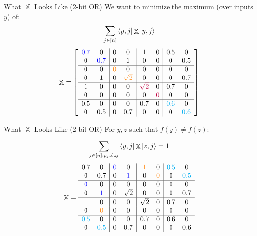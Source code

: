 \documentclass[12pt]{beamer}
\DeclareMathOperator{\X}{\mathbb{X}}		     %
\begin{document}
\begin{frame}{What $\X$ Looks Like (2-bit OR)}
    We want to minimize the maximum (over inputs $y$) of:
    \begin{align}
         \sum_{j \in [n]}
    \bra{y,j}\X\ket{y,j}   \nonumber
    \end{align}
    \begin{align}
    \X = \left[ \begin{array}{cc|cc|cc|cc}
    \color{blue}0.7 & 0 & 0 & 0 & 1 & 0 & 0.5 & 0\\
    0 & \color{blue}0.7 & 0 & 1 & 0 & 0 & 0 & 0.5\\
    \hline
    0 & 0 & \color{orange}0 & 0 & 0 & 0 & 0 & 0\\
    0 & 1 & 0 & \color{orange}\sqrt{2} & 0 & 0 & 0 & 0.7\\
    \hline
    1 & 0 & 0 & 0 & \color{purple}\sqrt{2} & 0 & 0.7 & 0\\
    0 & 0 & 0 & 0 & 0 & \color{purple}0 & 0 & 0\\
    \hline
    0.5 & 0 & 0 & 0 & 0.7 & 0 & \color{cyan}0.6 & 0\\
    0 & 0.5 & 0 & 0.7 & 0 & 0 & 0 & \color{cyan}0.6\\
    \end{array}
\right] \nonumber
\end{align}
\end{frame}

\begin{frame}{What $\X$ Looks Like (2-bit OR)}
    For $y,z$ such that $f(y) \neq f(z)$:
    
    \begin{align}
         \sum_{j \in [n]: y_j \ne z_j} 
    \bra{y,j} \X \ket{z, j} = 1 \nonumber
    \end{align}
    \begin{align}
    \X = \begin{array}{cc|cc|cc|cc}
    0.7 & 0 & \color{blue}0 & 0 & \color{orange}1 & 0 & \color{cyan}0.5 & 0\\
    0 & 0.7 & 0 & \color{blue}1 & 0 & \color{orange}0 & 0 & \color{cyan}0.5\\
    \hline
    \color{blue}0 & 0 & 0 & 0 & 0 & 0 & 0 & 0\\
    0 & \color{blue}1 & 0 & \sqrt{2} & 0 & 0 & 0 & 0.7\\
    \hline
    \color{orange}1 & 0 & 0 & 0 & \sqrt{2} & 0 & 0.7 & 0\\
    0 & \color{orange}0 & 0 & 0 & 0 & 0 & 0 & 0\\
    \hline
    \color{cyan}0.5 & 0 & 0 & 0 & 0.7 & 0 & 0.6 & 0\\
    0 & \color{cyan}0.5 & 0 & 0.7 & 0 & 0 & 0 & 0.6\\
    \end{array} \nonumber
\end{align}
\end{frame}
\end{document}
